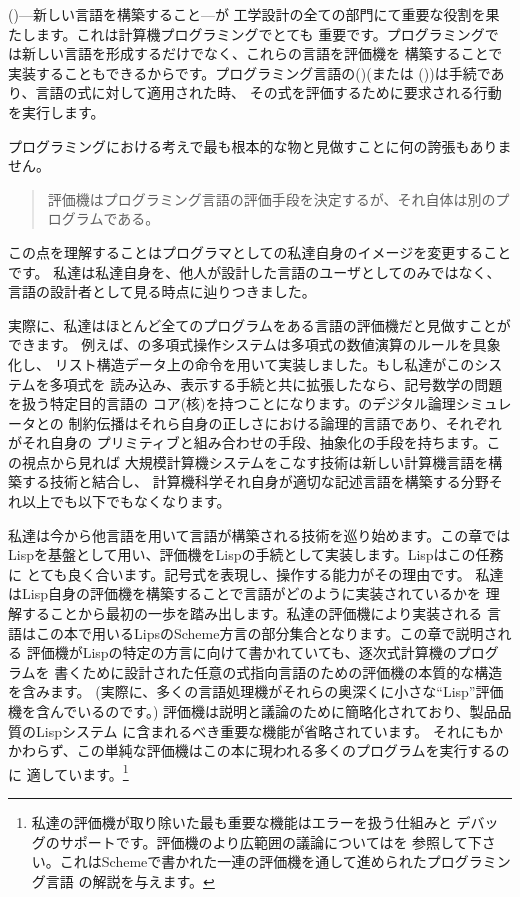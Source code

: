 ()---新しい言語を構築すること---が
工学設計の全ての部門にて重要な役割を果たします。これは計算機プログラミングでとても
重要です。プログラミングでは新しい言語を形成するだけでなく、これらの言語を評価機を
構築することで実装することもできるからです。プログラミング言語の()(または
())は手続であり、言語の式に対して適用された時、
その式を評価するために要求される行動を実行します。



プログラミングにおける考えで最も根本的な物と見做すことに何の誇張もありません。

\begin{quote}
評価機はプログラミング言語の評価手段を決定するが、それ自体は別のプログラムである。
\end{quote}

\noindent
この点を理解することはプログラマとしての私達自身のイメージを変更することです。
私達は私達自身を、他人が設計した言語のユーザとしてのみではなく、
言語の設計者として見る時点に辿りつきました。


実際に、私達はほとんど全てのプログラムをある言語の評価機だと見做すことができます。
例えば、の多項式操作システムは多項式の数値演算のルールを具象化し、
リスト構造データ上の命令を用いて実装しました。もし私達がこのシステムを多項式を
読み込み、表示する手続と共に拡張したなら、記号数学の問題を扱う特定目的言語の
コア(核)を持つことになります。のデジタル論理シミュレータとの
制約伝播はそれら自身の正しさにおける論理的言語であり、それぞれがそれ自身の
プリミティブと組み合わせの手段、抽象化の手段を持ちます。この視点から見れば
大規模計算機システムをこなす技術は新しい計算機言語を構築する技術と結合し、
計算機科学それ自身が適切な記述言語を構築する分野それ以上でも以下でもなくなります。



私達は今から他言語を用いて言語が構築される技術を巡り始めます。この章では
Lispを基盤として用い、評価機をLispの手続として実装します。Lispはこの任務に
とても良く合います。記号式を表現し、操作する能力がその理由です。
私達はLisp自身の評価機を構築することで言語がどのように実装されているかを
理解することから最初の一歩を踏み出します。私達の評価機により実装される
言語はこの本で用いるLipsのScheme方言の部分集合となります。この章で説明される
評価機がLispの特定の方言に向けて書かれていても、逐次式計算機のプログラムを
書くために設計された任意の式指向言語のための評価機の本質的な構造を含みます。
(実際に、多くの言語処理機がそれらの奥深くに小さな``Lisp''評価機を含んでいるのです。)
評価機は説明と議論のために簡略化されており、製品品質のLispシステム
に含まれるべき重要な機能が省略されています。
それにもかかわらず、この単純な評価機はこの本に現われる多くのプログラムを実行するのに
適しています。\footnote{私達の評価機が取り除いた最も重要な機能はエラーを扱う仕組みと
デバッグのサポートです。評価機のより広範囲の議論についてはを
参照して下さい。これはSchemeで書かれた一連の評価機を通して進められたプログラミング言語
の解説を与えます。}


